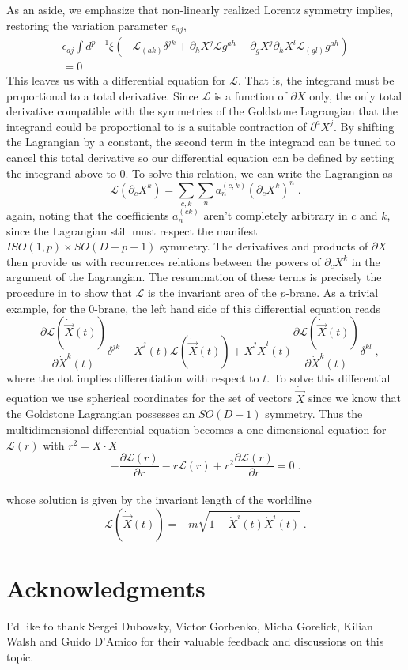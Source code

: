 \documentclass[%
 reprint,
 amsmath,amssymb,
 aps,
]{revtex4-1}
\begin{document}
As an aside, we emphasize that non-linearly realized Lorentz symmetry implies, restoring the variation parameter $\epsilon_{a j}$,
\begin{eqnarray}
    \epsilon_{a j} \int d^{p+1} \xi \left(
    -\mathcal{L}_{(a k)} \delta^{j k}
    + \partial_h X^j \mathcal{L} g^{a h}
    - \partial_g X^j \partial_h X^l \mathcal{L}_{(g l)} g^{a h} \right) \nonumber \\
    = 0 \nonumber
\end{eqnarray}
This leaves us with a differential equation for $\mathcal{L}$. That is, the integrand must be
proportional to a total derivative. Since $\mathcal{L}$ is a function of
$\partial X$ only, the only total derivative compatible with the symmetries of the Goldstone Lagrangian
that the integrand could be proportional to is a suitable contraction of $\partial^a X^j$. By shifting the
Lagrangian by a constant, the second term in the integrand can be tuned to cancel this total derivative so
our differential equation can be defined by setting the integrand above to 0.
To solve this relation, we can write the Lagrangian as
\begin{equation}
    \mathcal{L}(\partial_c X^k) = \sum_{c, k} \sum_n a^{(c, k)}_n (\partial_c X^k)^n \; . \nonumber
\end{equation}
again, noting that the coefficients $a_n^{(c k)}$ aren't completely arbitrary in $c$ and $k$, since the Lagrangian still must
respect the manifest $ISO(1,p) \times SO(D-p-1)$ symmetry. The derivatives and products of $\partial X$ then provide us with
recurrences relations between the powers of $\partial_c X^k$ in the argument of the Lagrangian. The resummation of these terms
is precisely the procedure in \cite{Gliozzi:2012cx} to show that $\mathcal{L}$ is the invariant area of the $p$-brane.
As a trivial example, for the $0$-brane, the left hand side of this differential equation reads
\begin{equation}
    -\frac{\partial \mathcal{L}(\dot{\vec{X}}(t) )}{\partial \dot{X}^k(t) } \delta^{jk} - \dot{X}^j(t) \mathcal{L}(\dot{\vec{X}}(t))
    + \dot{X}^j \dot{X}^l(t) \frac{\partial \mathcal{L}(\dot{\vec{X}}(t) )}{\partial \dot{X}^k(t)} \delta^{kl} \; , \nonumber
\end{equation}
where the dot implies differentiation with respect to $t$.  To solve this differential equation we use spherical coordinates for the
set of vectors $\dot{\vec{X}}$ since we know that the Goldstone Lagrangian possesses an $SO(D-1)$ symmetry.
Thus the multidimensional differential equation becomes a one dimensional equation for $\mathcal{L}(r)$ with $r^2 = \dot{X} \cdot \dot{X}$
\begin{equation}
    -\frac{\partial \mathcal{L}(r)}{\partial r} - r \mathcal{L}(r) + r^2 \frac{\partial \mathcal{L}(r)}{\partial r} = 0 \; . \nonumber
\end{equation}
\\
whose solution is given by the invariant length of the worldline
\begin{equation}
    \mathcal{L}(\dot{\vec{X}}(t)) = -m \sqrt{1 - \dot{X}^i(t) \dot{X}^i(t)} \; . \nonumber
\end{equation}

\section{Acknowledgments}
I'd like to thank Sergei Dubovsky, Victor Gorbenko, Micha Gorelick, Kilian Walsh and Guido D'Amico for their valuable feedback and discussions on this topic.


\end{document}
